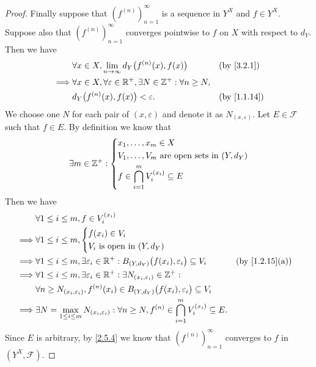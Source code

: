 \begin{proof}
  Finally suppose that \((f^{(n)})_{n = 1}^\infty\) is a sequence in \(Y^X\) and \(f \in Y^X\).
  Suppose also that \((f^{(n)})_{n = 1}^\infty\) converges pointwise to \(f\) on \(X\) with respect to \(d_Y\).
  Then we have
  \begin{align*}
             & \forall x \in X, \lim_{n \to \infty} d_Y\big(f^{(n)}(x), f(x)\big)                    &  & \by{3.2.1}  \\
    \implies & \forall x \in X, \forall \varepsilon \in \R^+, \exists N \in \Z^+ : \forall n \geq N,                  \\
             & d_Y\big(f^{(n)}(x), f(x)\big) < \varepsilon.                                          &  & \by{1.1.14}
  \end{align*}
  We choose one \(N\) for each pair of \((x, \varepsilon)\) and denote it as \(N_{(x, \varepsilon)}\).
  Let \(E \in \mathcal{F}\) such that \(f \in E\).
  By definition we know that
  \[
    \exists m \in \mathbb{Z}^+ : \begin{dcases}
      x_1, \dots, x_m \in X                              \\
      V_1, \dots, V_m \text{ are open sets in } (Y, d_Y) \\
      f \in \bigcap_{i = 1}^m V_i^{(x_i)} \subseteq E
    \end{dcases}
  \]
  Then we have
  \begin{align*}
             & \forall 1 \leq i \leq m, f \in V_i^{(x_i)}                                                                                                                               \\
    \implies & \forall 1 \leq i \leq m, \begin{dcases}
                                          f(x_i) \in V_i \\
                                          V_i \text{ is open in } (Y, d_Y)
                                        \end{dcases}                                                                                                                 \\
    \implies & \forall 1 \leq i \leq m, \exists \varepsilon_i \in \R^+ : B_{(Y, d_Y)}\big(f(x_i), \varepsilon_i\big) \subseteq V_i                    &  & \text{(by \cref{1.2.15}(a))} \\
    \implies & \forall 1 \leq i \leq m, \exists \varepsilon_i \in \R^+ : \exists N_{(x_i, \varepsilon_i)} \in \Z^+ :                                                                    \\
             & \forall n \geq N_{(x_i, \varepsilon_i)}, f^{(n)}(x_i) \in B_{(Y, d_Y)}\big(f(x_i), \varepsilon_i\big) \subseteq V_i                                                      \\
    \implies & \exists N = \max_{1 \leq i \leq m} N_{(x_i, \varepsilon_i)} : \forall n \geq N, f^{(n)} \in \bigcap_{i = 1}^m V_i^{(x_i)} \subseteq E.
  \end{align*}
  Since \(E\) is arbitrary, by \cref{2.5.4} we know that \((f^{(n)})_{n = 1}^\infty\) converges to \(f\) in \((Y^X, \mathcal{F})\).
\end{proof}